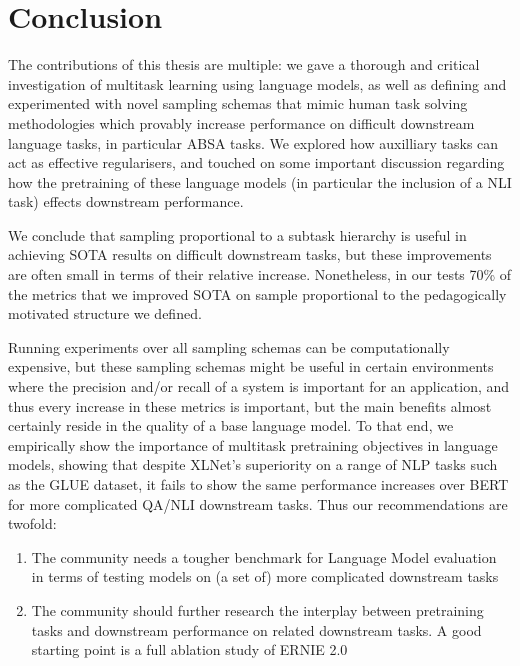 \documentclass[11pt]{report}
\theoremstyle{Definition}
\theoremstyle{remark}
\begin{document}

\mbox{}
\printnomenclature
\newpage

 
\newpage \cleardoublepage

 
\newpage \cleardoublepage

 
\newpage \cleardoublepage

 
\newpage \cleardoublepage

 
\newpage \cleardoublepage

\chapter{Conclusion}
The contributions of this thesis are multiple: we gave a thorough and critical investigation of multitask learning using language models, as well as defining and experimented with novel sampling schemas that mimic human task solving methodologies which provably increase performance on difficult downstream language tasks, in particular ABSA tasks. We explored how auxilliary tasks can act as effective regularisers, and touched on some important discussion regarding how the pretraining of these language models (in particular the inclusion of a NLI task) effects downstream performance. 

We conclude that sampling proportional to a subtask hierarchy is useful in achieving SOTA results on difficult downstream tasks, but these improvements are often small in terms of their relative increase. Nonetheless, in our tests 70\% of the metrics that we improved SOTA on sample proportional to the pedagogically motivated structure we defined.

Running experiments over all sampling schemas can be computationally expensive, but these sampling schemas might be useful in certain environments where the precision and/or recall of a system is important for an application, and thus every increase in these metrics is important, but the main benefits almost certainly reside in the quality of a base language model. To that end, we empirically show the importance of multitask pretraining objectives in language models, showing that despite XLNet's superiority on a range of NLP tasks such as the GLUE dataset, it fails to show the same performance increases over BERT for more complicated QA/NLI downstream tasks. Thus our recommendations are twofold: 
\begin{enumerate}
	\item The community needs a tougher benchmark for Language Model evaluation in terms of testing models on (a set of) more complicated downstream tasks
	\item The community should further research the interplay between pretraining tasks and downstream performance on related downstream tasks. A good starting point is a full ablation study of ERNIE 2.0 \cite{Sun2019a}
\end{enumerate}
\end{document}
